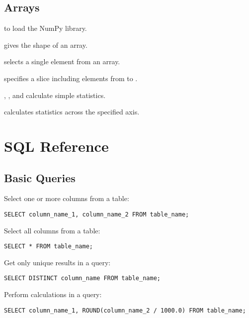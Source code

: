 \subsection*{Arrays}

\begin{swcitemize}
\item
   to load the NumPy library.
\item
   gives the shape of an array.
\item
   selects a single element from an array.
\item
   specifies a slice including elements from
   to .
\item
  , , and 
  calculate simple statistics.
\item
   calculates statistics across the specified
  axis.
\end{swcitemize}

\section{SQL Reference}

\subsection*{Basic Queries}

Select one or more columns from a table:

\begin{Verbatim}
SELECT column_name_1, column_name_2 FROM table_name;
\end{Verbatim}

Select all columns from a table:

\begin{Verbatim}
SELECT * FROM table_name;
\end{Verbatim}

Get only unique results in a query:

\begin{Verbatim}
SELECT DISTINCT column_name FROM table_name;
\end{Verbatim}

Perform calculations in a query:

\begin{Verbatim}
SELECT column_name_1, ROUND(column_name_2 / 1000.0) FROM table_name;
\end{Verbatim}

